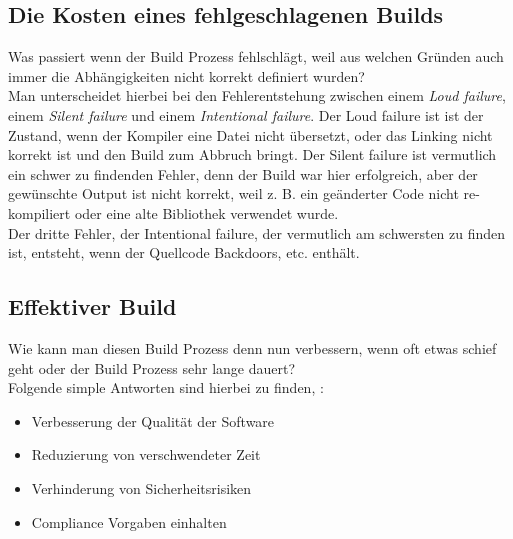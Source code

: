 \subsection{Die Kosten eines fehlgeschlagenen Builds}
Was passiert wenn der Build Prozess fehlschlägt, weil aus welchen Gründen auch immer die Abhängigkeiten nicht korrekt definiert wurden?
\\
Man unterscheidet hierbei bei den Fehlerentstehung zwischen einem \textit{Loud failure}, einem \textit{Silent failure} und einem \textit{Intentional failure}.
Der Loud failure ist ist der Zustand, wenn der Kompiler eine Datei nicht übersetzt, oder das Linking nicht korrekt ist und den Build zum Abbruch bringt.
Der Silent failure ist vermutlich ein schwer zu findenden Fehler, denn der Build war hier erfolgreich, aber der gewünschte Output ist nicht korrekt, weil \acs{z. B.} ein geänderter Code nicht re-kompiliert oder eine alte Bibliothek verwendet wurde.
\\
Der dritte Fehler, der Intentional failure, der vermutlich am  schwersten zu finden ist, entsteht, wenn der Quellcode Backdoors, \acs{etc.} enthält. \cite{software-analysis}

\subsection{Effektiver Build}
Wie kann man diesen Build Prozess denn nun verbessern, wenn oft etwas schief geht oder der Build Prozess sehr lange dauert?
\\
Folgende simple Antworten sind hierbei zu finden, \cite{software-analysis}:
\begin{itemize}
	\item Verbesserung der Qualität der Software
	\item Reduzierung von verschwendeter Zeit
	\item Verhinderung von Sicherheitsrisiken 
	\item Compliance Vorgaben einhalten 
\end{itemize}
